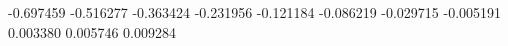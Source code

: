 -0.697459
-0.516277
-0.363424
-0.231956
-0.121184
-0.086219
-0.029715
-0.005191
0.003380
0.005746
0.009284
